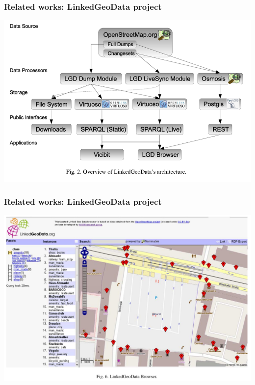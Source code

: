 \documentclass[10pt]{beamer}
\begin{document}
\begin{frame}
  \frametitle{Related works: LinkedGeoData project}
  \centering
  \includegraphics[width=\linewidth]{lgd-sys.png}
\end{frame}

\begin{frame}
  \frametitle{Related works: LinkedGeoData project}
  \centering
  \includegraphics[width=\linewidth]{lgd-screen.png}
\end{frame}
\end{document}
